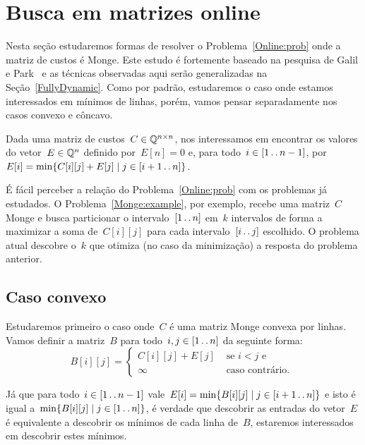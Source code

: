 \section{Busca em matrizes online}
\label{Online}

Nesta seção estudaremos formas de resolver o Problema~\ref{Online:prob} onde a matriz de custos é Monge. Este estudo é fortemente baseado na pesquisa de Galil e Park~\cite{Galil:1992} e as técnicas observadas aqui serão generalizadas na Seção~\ref{FullyDynamic}. Como por padrão, estudaremos o caso onde estamos interessados em mínimos de linhas, porém, vamos pensar separadamente nos casos convexo e côncavo.

\begin{prob} \label{Online:prob}
Dada uma matriz de custos~$C \in \mathbb{Q}^{n \times n}$, nos interessamos em encontrar os valores do vetor~$E \in \mathbb{Q}^{n}$ definido por~$E[n] = 0$ e, para todo~$i \in [1 \,.\,.\, n-1]$, por~${E[i] = \min\{ C[i][j] + E[j] \mid j \in [i+1 \,.\,.\, n]\}}$.
\end{prob}

É fácil perceber a relação do Problema~\ref{Online:prob} com os problemas já estudados. O Problema~\ref{Monge:example}, por exemplo, recebe uma matriz~$C$ Monge e busca particionar o intervalo~$[1 \,.\,.\, n]$ em~$k$ intervalos de forma a maximizar a soma de~$C[i][j]$ para cada intervalo~$[i \,.\,.\, j]$ escolhido. O problema atual descobre o~$k$ que otimiza (no caso da minimização) a resposta do problema anterior.


\subsection{Caso convexo}

Estudaremos primeiro o caso onde~$C$ é uma matriz Monge convexa por linhas. Vamos definir a matriz~$B$ para todo~$i,j \in [1 \,.\,.\, n]$ da seguinte forma:
\begin{equation} \label{Online:Bconv}
B[i][j] = \begin{cases}
    C[i][j] + E[j] & \text{ se } i < j \text{ e } \\
    \infty         & \text{ caso contrário. } 
\end{cases}
\end{equation}

Já que para todo~$i \in [1 \,.\,.\, n-1]$ vale~$E[i] = \min\{B[i][j] \mid j \in [i+1 \,.\,.\, n]\}$ e isto é igual a~${\min\{B[i][j] \mid j \in [1 \,.\,.\, n]\}}$, é verdade que descobrir as entradas do vetor~$E$ é equivalente a descobrir os mínimos de cada linha de~$B$, estaremos interessados em descobrir estes mínimos.

